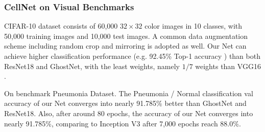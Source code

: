 {\subsubsection{CellNet on Visual Benchmarks}



CIFAR-10 dataset\cite{21} consists of 60,000 $32 \times 32$ color images in 10 classes, with 50,000 training images and 10,000 test images. A common data augmentation scheme including random crop\cite{22} and mirroring\cite{19} is adopted as well. Our Net can achieve higher classification performance  (e.g.  92.45\%  Top-1  accuracy  ) than both ResNet18 and GhostNet, with the least  weights, namely $1/7$ weights than VGG16 \cite{23}. 


On benchmark Pneumonia Dataset\cite{38}. The Pneumonia / Normal classification val accuracy of our Net converges into nearly 91.785\% better than GhostNet and ResNet18. Also, after around 80 epochs, the accuracy of our Net converges into nearly 91.785\%, comparing to  Inception V3 after 7,000 epochs reach 88.0\%\cite{38}.

}
